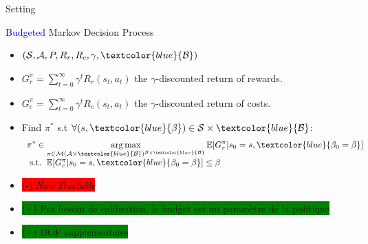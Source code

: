 \documentclass[french,handout]{beamer}
\begin{document}
    \begin{frame}{Setting}

        \begin{block}{\textcolor{blue}{Budgeted} Markov Decision Process}
            \begin{itemize}
                \item $(\cS, \cA, P, R_r,{R_c}, \gamma,\textcolor{blue}{\cB})$
                \item $G_r^\pi = \sum_{t=0}^\infty \gamma^t R_r(s_t, a_t)$ the $\gamma$-discounted return of rewards.
                \item  $G_c^\pi = \sum_{t=0}^\infty \gamma^t R_c(s_t, a_t)$ the $\gamma$-discounted return of costs.
                \item Find $\pi^*$ s.t $\forall (s,\textcolor{blue}{\beta})\in\cS\times\textcolor{blue}{\cB}$:
                \begin{equation}
                    \label{eq:bmdp}
                    \begin{array}{lcr}
                        \displaystyle \pi^* \in \argmax_{\pi\in\cM(\cA\times\textcolor{blue}{\cB})^{\cS\times\textcolor{blue}{\cB}}} \expectedvalue[G_r^\pi | s_0=s,\textcolor{blue}{\beta_0=\beta}] \\
                        \text{ s.t. }  \expectedvalue[G_c^\pi | s_0=s,\textcolor{blue}{\beta_0=\beta}] \leq \beta
                    \end{array}
                \end{equation}
            \end{itemize}
        \end{block}


        \begin{block}{}
            \begin{itemize}
                \item \colorbox{red}{(-) \textit{Non Tractable}}
                \item \colorbox{green}{(+) Pas besoin de calibration, le budget est un paramètre de la politique}
                \item \colorbox{green}{(+) DOF supplémentaire}
            \end{itemize}
        \end{block}

    \end{frame}
\end{document}
